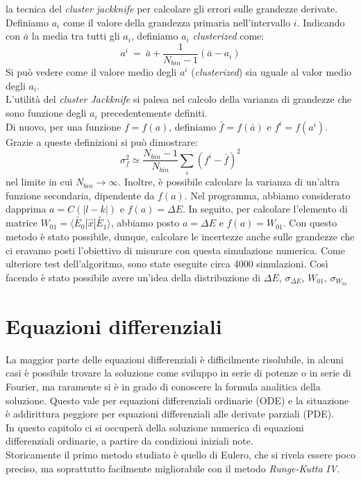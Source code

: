 la tecnica del \emph{cluster jackknife} per calcolare gli errori sulle grandezze derivate.\\
Definiamo $ a_i$ come il valore della grandezza primaria nell'intervallo $i$. Indicando con $\bar{a}$ la media tra tutti gli $a_i$, definiamo $a_i$ \emph{clusterized} come:
$$
a^i \ = \ \bar{a} + \frac{1}{N_{bin} -1} \left( \bar{a} - a_i\right) 
$$
Si può vedere come il valore medio degli $a^i$ (\emph{clusterized}) sia uguale al valor medio degli $a_i$.\\
L'utilità del \emph{cluster Jackknife} si palesa nel calcolo della varianza di grandezze che sono funzione degli $a_i$ precedentemente definiti.\\
Di nuovo, per una funzione $ f  =  f(a)$, definiamo $ \bar{f}  =  f(\bar{a})$ e $ f^i  =  f( a^i)$. Grazie a queste definizioni si può
dimostrare:
$$
 \sigma_f^2 \simeq \frac{ N_{bin} - 1}{N_{bin}} \sum_i \left( f^i - \bar{f} \right)^2
$$
nel limite in cui $N_{bin} \rightarrow \infty$. Inoltre, è possibile calcolare la varianza di un'altra funzione secondaria, dipendente da $f(a)$.
Nel programma, abbiamo considerato dapprima $ a = C( | l -k|) $ e $f(a) = \Delta E$.
In seguito, per calcolare l'elemento di matrice $ W_{01} =\langle \tilde{E_0} | \hat{x} | \tilde{E_1} \rangle $, abbiamo posto $a = \Delta E$ e $f(a) = W_{01}$.
Con questo metodo  è stato possibile, dunque, calcolare le incertezze anche sulle grandezze che ci eravamo posti l'obiettivo di misurare con questa simulazione numerica.
Come ulteriore test dell'algoritmo, sono state eseguite circa 4000 simulazioni.
Così facendo è stato possibile avere un'idea della distribuzione di $\Delta E$, $\sigma_{\Delta E}$, $W_{01}$, $\sigma_{W_{01}}$






\chapter{Equazioni differenziali}
La maggior parte delle equazioni differenziali è difficilmente risolubile, in alcuni casi è possibile trovare la soluzione come sviluppo in serie di potenze o
in serie di Fourier, ma raramente si è in grado di conoscere la formula analitica della soluzione. Questo vale per equazioni differenziali ordinarie (ODE)
e la situazione è addirittura peggiore per equazioni differenziali alle derivate parziali (PDE).\\
In questo capitolo ci si occuperà della soluzione numerica di equazioni differenziali ordinarie, a partire da condizioni iniziali note.\\
Storicamente il primo metodo studiato è quello di Eulero, che si rivela essere poco preciso, ma soprattutto facilmente migliorabile con 
il metodo \emph{ Runge-Kutta IV}.
